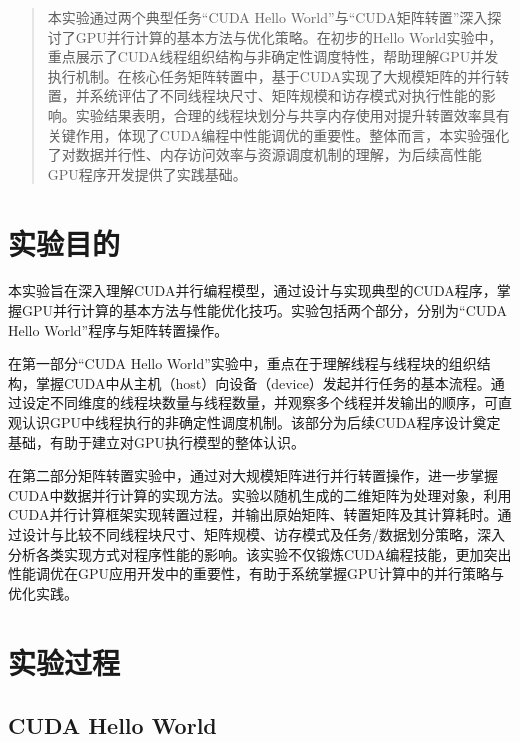 \documentclass[a4paper, utf8]{ctexart}
\begin{document}
	\maketitle
	
	\renewcommand{\abstractname}{\large \textbf{摘要}}
	\begin{abstract}
		本实验通过两个典型任务“CUDA Hello World”与“CUDA矩阵转置”深入探讨了GPU并行计算的基本方法与优化策略。在初步的Hello World实验中，重点展示了CUDA线程组织结构与非确定性调度特性，帮助理解GPU并发执行机制。在核心任务矩阵转置中，基于CUDA实现了大规模矩阵的并行转置，并系统评估了不同线程块尺寸、矩阵规模和访存模式对执行性能的影响。实验结果表明，合理的线程块划分与共享内存使用对提升转置效率具有关键作用，体现了CUDA编程中性能调优的重要性。整体而言，本实验强化了对数据并行性、内存访问效率与资源调度机制的理解，为后续高性能GPU程序开发提供了实践基础。
		
	\end{abstract}
	
	\section{实验目的}
	
	本实验旨在深入理解CUDA并行编程模型，通过设计与实现典型的CUDA程序，掌握GPU并行计算的基本方法与性能优化技巧。实验包括两个部分，分别为“CUDA Hello World”程序与矩阵转置操作。
	
	在第一部分“CUDA Hello World”实验中，重点在于理解线程与线程块的组织结构，掌握CUDA中从主机（host）向设备（device）发起并行任务的基本流程。通过设定不同维度的线程块数量与线程数量，并观察多个线程并发输出的顺序，可直观认识GPU中线程执行的非确定性调度机制。该部分为后续CUDA程序设计奠定基础，有助于建立对GPU执行模型的整体认识。
	
	在第二部分矩阵转置实验中，通过对大规模矩阵进行并行转置操作，进一步掌握CUDA中数据并行计算的实现方法。实验以随机生成的二维矩阵为处理对象，利用CUDA并行计算框架实现转置过程，并输出原始矩阵、转置矩阵及其计算耗时。通过设计与比较不同线程块尺寸、矩阵规模、访存模式及任务/数据划分策略，深入分析各类实现方式对程序性能的影响。该实验不仅锻炼CUDA编程技能，更加突出性能调优在GPU应用开发中的重要性，有助于系统掌握GPU计算中的并行策略与优化实践。
	
	\section{实验过程}
	
	\subsection{CUDA Hello World}
	
\end{document}
